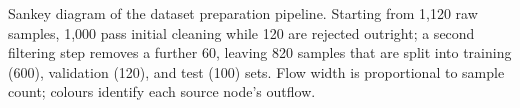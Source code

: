 \caption{Sankey diagram of the dataset preparation pipeline. Starting from 1{,}120 raw samples, 1{,}000 pass initial cleaning while 120 are rejected outright; a second filtering step removes a further 60, leaving 820 samples that are split into training (600), validation (120), and test (100) sets. Flow width is proportional to sample count; colours identify each source node's outflow.}
